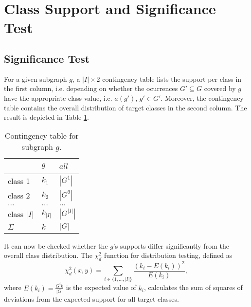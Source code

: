 \documentclass{article}
\begin{document}
\section{Class Support and Significance Test}
\label{s:significance-estimation}

\subsection{Significance Test}
\label{ss:significance-test}
For a given subgraph $g$, a $|I| \times 2$ contingency table lists the
support per class in the first column, i.e. depending on whether the
ocurrences $G' \subseteq G$ covered by $g$ have the appropriate class value, i.e. $a(g')$, $g' \in G'$.
Moreover, the contingency table contains the overall distribution of target
classes in the second column.  The result is depicted in Table
\ref{t-ContingencyTableIndTest}.

\begin{table}[t]
  \centering
  \begin{tabular}{|l|l|l|}
    \hline
    ~           &	$g$       & $all$       \\\hline
    class 1	    &	$k_1$     & $|G^1|$     \\\hline
    class 2 	  &	$k_2$     & $|G^2|$     \\\hline
    $\ldots$ 	  &	$\ldots$  & $\ldots$    \\\hline
    class $|I|$	&	$k_{|I|}$ & $|G^{|I|}|$ \\\hline
    $\Sigma$	  &	$k$       & $|G|$       \\\hline
  \end{tabular}
  \caption[]{Contingency table for subgraph $g$.}
  \label{t-ContingencyTableIndTest}
\end{table}

It can now be checked whether the $g$'s supports differ
significantly from the overall class distribution.  The $\chi^2_d$ function for
distribution testing, defined as
\begin{equation}
  \chi^2_d(x,y) = \sum_{i \in \{1,\ldots,|I|\}} \frac{(k_i-E(k_i))^2}{E(k_i)},
  \label{eq:chid}
\end{equation} 
where $E(k_i)=\frac{G^{i}k}{|G|}$ is the expected value of $k_i$, calculates
the sum of squares of deviations from the expected support for all target classes. 

\end{document}
